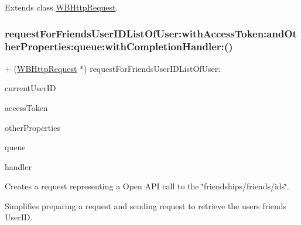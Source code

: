 Extends class \mbox{\hyperlink{interface_w_b_http_request_a388ba16ea6e89e121893833f2a7d7b86}{W\+B\+Http\+Request}}.

\mbox{\label{category_w_b_http_request_07_weibo_user_08_a388ba16ea6e89e121893833f2a7d7b86}} 
\subsubsection{\texorpdfstring{request\+For\+Friends\+User\+I\+D\+List\+Of\+User\+:with\+Access\+Token\+:and\+Other\+Properties\+:queue\+:with\+Completion\+Handler\+:()}{requestForFriendsUserIDListOfUser:withAccessToken:andOtherProperties:queue:withCompletionHandler:()}\hspace{0.1cm}{\footnotesize\ttfamily [3/3]}}
{\footnotesize\ttfamily + (\mbox{\hyperlink{interface_w_b_http_request}{W\+B\+Http\+Request}} $\ast$) request\+For\+Friends\+User\+I\+D\+List\+Of\+User\+: \begin{DoxyParamCaption}\item[{(N\+S\+String $\ast$)}]{current\+User\+ID }\item[{withAccessToken:(N\+S\+String $\ast$)}]{access\+Token }\item[{andOtherProperties:(N\+S\+Dictionary $\ast$)}]{other\+Properties }\item[{queue:(N\+S\+Operation\+Queue $\ast$)}]{queue }\item[{withCompletionHandler:(W\+B\+Request\+Handler)}]{handler }\end{DoxyParamCaption}}

Creates a request representing a Open A\+PI call to the \char`\"{}friendships/friends/ids\char`\"{}.

Simplifies preparing a request and sending request to retrieve the user\textquotesingle{}s friends\textquotesingle{} User\+ID.

